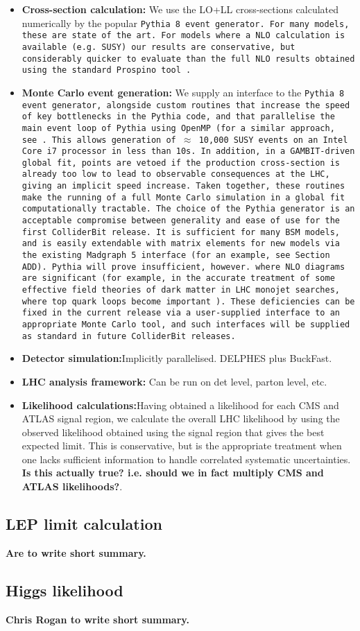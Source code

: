 \begin{itemize}
\item \textbf{Cross-section calculation: } We use the LO+LL cross-sections calculated numerically by the popular \tt Pythia 8 \rm event generator. For many models, these are state of the art. For models where a NLO calculation is available (e.g. SUSY) our results are conservative, but considerably quicker to evaluate than the full NLO results obtained using the standard \tt Prospino \rm tool~\cite{Beenakker:1996ed}.
\item \textbf{Monte Carlo event generation: }We supply an interface to the \tt Pythia 8 \rm event generator, alongside custom routines that increase the speed of key bottlenecks in the Pythia code, and that parallelise the main event loop of \tt Pythia \rm using \tt OpenMP \rm (for a similar approach, see~\cite{Lester:2005je}. This allows generation of $\approx$ 10,000 SUSY events on an Intel Core i7 processor in less than 10s. In addition, in a GAMBIT-driven global fit, points are vetoed if the production cross-section is already too low to lead to observable consequences at the LHC, giving an implicit speed increase. Taken together, these routines make the running of a full Monte Carlo simulation in a global fit computationally tractable. The choice of the \tt Pythia \rm generator is an acceptable compromise between generality and ease of use for the first \tt ColliderBit \rm release. It is sufficient for many BSM models, and is easily extendable with matrix elements for new models via the existing \tt Madgraph 5 \rm interface (for an example, see Section ADD). \tt Pythia \rm will prove insufficient, however.  where NLO diagrams are significant (for example, in the accurate treatment of some effective field theories of dark matter in LHC monojet searches, where top quark loops become important~\cite{Buckley:2014fba}). These deficiencies can be fixed in the current release via a user-supplied interface to an appropriate Monte Carlo tool, and such interfaces will be supplied as standard in future \tt ColliderBit \rm releases.
\item \textbf{Detector simulation:}Implicitly parallelised. DELPHES plus BuckFast.
\item \textbf{LHC analysis framework:} Can be run on det level, parton level, etc.
\item \textbf{Likelihood calculations:}Having obtained a likelihood for each CMS and ATLAS signal region, we calculate the overall LHC likelihood by using the observed likelihood obtained using the signal region that gives the best expected limit. This is conservative, but is the appropriate treatment when one lacks sufficient information to handle correlated systematic uncertainties. \textbf{Is this actually true? i.e. should we in fact multiply CMS and ATLAS likelihoods?}. 
\end{itemize}



\subsection{LEP limit calculation}

\textbf{Are to write short summary.}

\subsection{Higgs likelihood}
\textbf{Chris Rogan to write short summary.}
